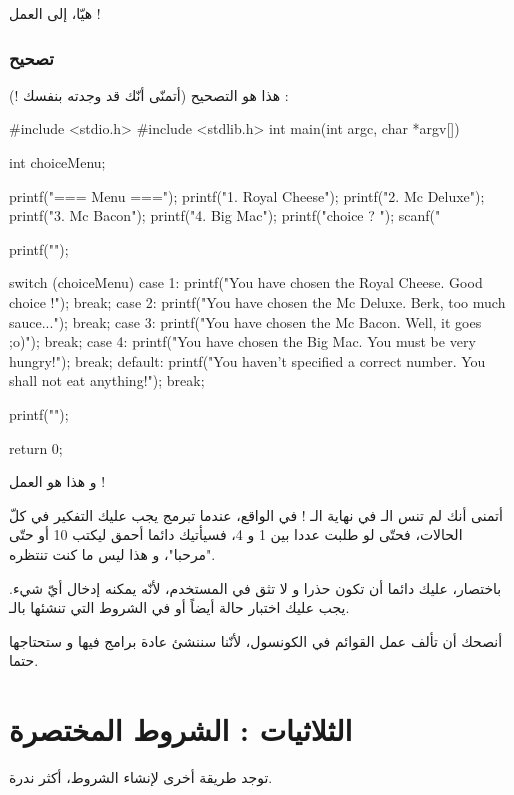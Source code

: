 هيّا، إلى العمل !

\subsubsection{تصحيح}

هذا هو التصحيح (أتمنّى أنّك قد وجدته بنفسك !) :

\begin{Csource}
#include <stdio.h>
#include <stdlib.h>
int main(int argc, char *argv[])
{
	int choiceMenu;
	
	printf("=== Menu ===\n\n");
	printf("1. Royal Cheese\n");
	printf("2. Mc Deluxe\n");
	printf("3. Mc Bacon\n");
	printf("4. Big Mac\n");
	printf("\nYour choice ? ");
	scanf("%
	
	printf("\n");
	
	switch (choiceMenu)
	{
		case 1:
		printf("You have chosen the Royal Cheese. Good choice !");
		break;
		case 2:
		printf("You have chosen the Mc Deluxe. Berk, too much sauce...");
		break;
		case 3:
		printf("You have chosen the Mc Bacon. Well, it goes ;o)");
		break;
		case 4:
		printf("You have chosen the Big Mac. You must be very hungry!");
		break;
		default:
		printf("You haven't specified a correct number. You shall not eat anything!");
		break;
	}
	
	printf("\n\n");
	
	return 0;
}
\end{Csource}
و هذا هو العمل !

أتمنى أنك لم تنس الـ
 في نهاية الـ !
في الواقع، عندما تبرمج يجب عليك التفكير في كلّ الحالات،  فحتّى لو طلبت عددا بين 1 و 4، فسيأتيك دائما أحمق ليكتب 10 أو حتّى "مرحبا"،  و هذا ليس ما كنت تنتظره. 

باختصار، عليك دائما أن تكون حذرا و لا تثق في المستخدم، لأنّه يمكنه إدخال أيّ شيء. يجب عليك اختبار حالة
أيضاً أو 
في الشروط التي تنشئها بالـ.

\begin{information}
أنصحك أن تألف عمل القوائم في الكونسول، لأنّنا سننشئ عادة برامج فيها و ستحتاجها حتما.
\end{information}

\section{الثلاثيات : الشروط المختصرة}

توجد طريقة أخرى لإنشاء الشروط، أكثر ندرة.


